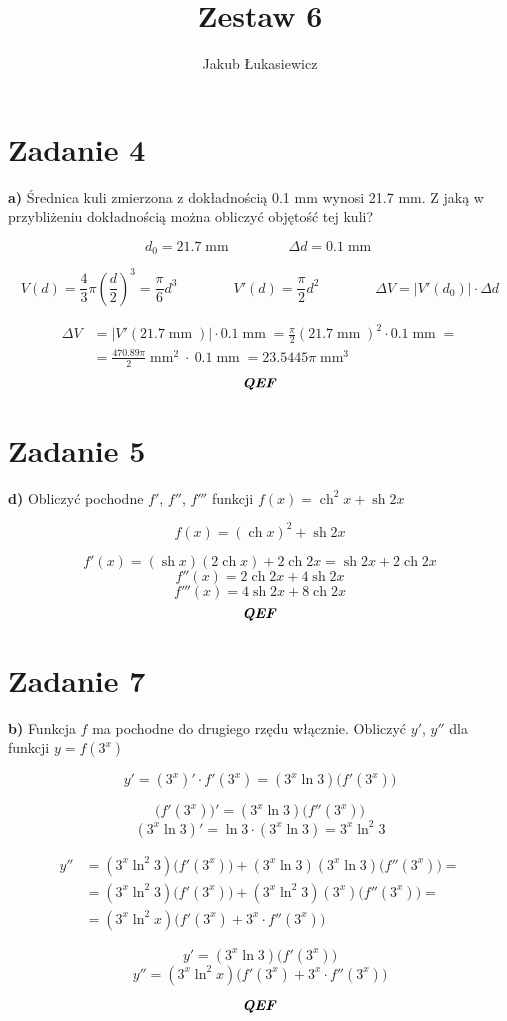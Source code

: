 \documentclass[12pt]{article}
\title{Zestaw 6}
\author{Jakub Łukasiewicz}
\date{}
\newcommand{\task}[1]{\section*{Zadanie #1}}
\newcommand{\ex}[1]{\textbf{ #1)}}
\newcommand{\qef}{\textbf{\textit{QEF}}}
\DeclareMathOperator{\ch}{ch}
\DeclareMathOperator{\sh}{sh}
\DeclareMathOperator{\mm}{\textrm{mm}}
\begin{document}
\maketitle

\task{4}\ex{a}
Średnica kuli zmierzona z dokładnością 0.1 mm wynosi 21.7 mm.
Z jaką w przybliżeniu dokładnością można obliczyć objętość tej kuli?

$$ d_0 = 21.7 \mm
\qquad\qquad
\Delta d = 0.1 \mm $$

$$ V(d) = \frac{4}{3}\pi(\frac{d}{2})^3 = \frac{\pi}{6}d^3
\qquad\qquad
V'(d) = \frac{\pi}{2}d^2
\qquad\qquad
\Delta V = |V'(d_0)| \cdot \Delta d $$

\begin{equation*}
    \begin{split}
        \Delta V &= |V'(21.7\mm)| \cdot 0.1\mm = \frac{\pi}{2}(21.7\mm)^2 \cdot 0.1\mm = \\
        &= \frac{470.89\pi}{2} \mm^2 \cdot \ 0.1\mm = 23.5445\pi \mm^3
    \end{split}
\end{equation*}
$$ \qef $$

\task{5}\ex{d}
Obliczyć pochodne $f'$, $f''$, $f'''$ funkcji $f(x) = \ch^2{x} + \sh{2x}$

$$ f(x) = (\ch{x})^2 + \sh{2x} $$

$$ f'(x) = (\sh{x})(2\ch{x}) + 2 \ch{2x} = \sh{2x} + 2\ch{2x} $$
$$ f''(x) = 2\ch{2x} + 4\sh{2x} $$
$$ f'''(x) = 4\sh{2x} + 8\ch{2x} $$
$$ \qef $$

\newpage

\task{7}\ex{b}
Funkcja $f$ ma pochodne do drugiego rzędu włącznie. Obliczyć $y'$, $y''$ dla funkcji $y = f(3^x)$

$$ y' = (3^x)' \cdot f'(3^x) = (3^x \ln{3})\big(f'(3^x)\big) $$

$$ \big(f'(3^x)\big)' = (3^x \ln{3})\big(f''(3^x)\big) $$
$$ (3^x \ln{3})' =  \ln{3} \cdot (3^x \ln{3}) = 3^x \ln^2{3} $$

\begin{equation*}
    \begin{split}
        y'' &= (3^x \ln^2{3})\big(f'(3^x)\big) + (3^x \ln{3})(3^x \ln{3})\big(f''(3^x)\big) = \\
        &= (3^x \ln^2{3})\big(f'(3^x)\big) + (3^x \ln^2{3})(3^x)\big(f''(3^x)\big) = \\
        &= (3^x \ln^2{x})\big(f'(3^x) + 3^x \cdot f''(3^x)\big)
    \end{split}
\end{equation*}


$$ y' = (3^x \ln{3})\big(f'(3^x)\big) $$
$$ y'' = (3^x \ln^2{x})\big(f'(3^x) + 3^x \cdot f''(3^x)\big) $$

$$ \qef $$
\end{document}
